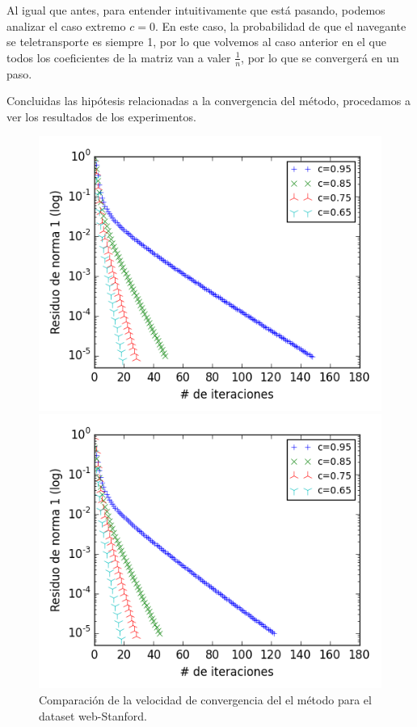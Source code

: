 Al igual que antes, para entender intuitivamente que está pasando, podemos analizar el caso extremo $c = 0$. En este caso, la probabilidad de que el navegante se teletransporte es siempre 1, por lo que volvemos al caso anterior en el que todos los coeficientes de la matriz van a valer $\frac1n$, por lo que se convergerá en un paso.

Concluidas las hipótesis relacionadas a la convergencia del método, procedamos a ver los resultados de los experimentos.


\begin{figure}[H]
\centering
\begin{minipage}{0.48\textwidth}
  \centering
    \includegraphics[width=1\textwidth]{imgs/convergencia-stanford.png}
  \caption{\footnotesize{Comparación de la velocidad de convergencia del el método para el dataset web-Stanford.}}
  \label{fig:conv1}
\end{minipage}
\hspace{0.02\textwidth}
\begin{minipage}{0.48\textwidth}
  \centering
    \includegraphics[width=1\textwidth]{imgs/convergencia-notredame.png}

\end{minipage}
\end{figure}
